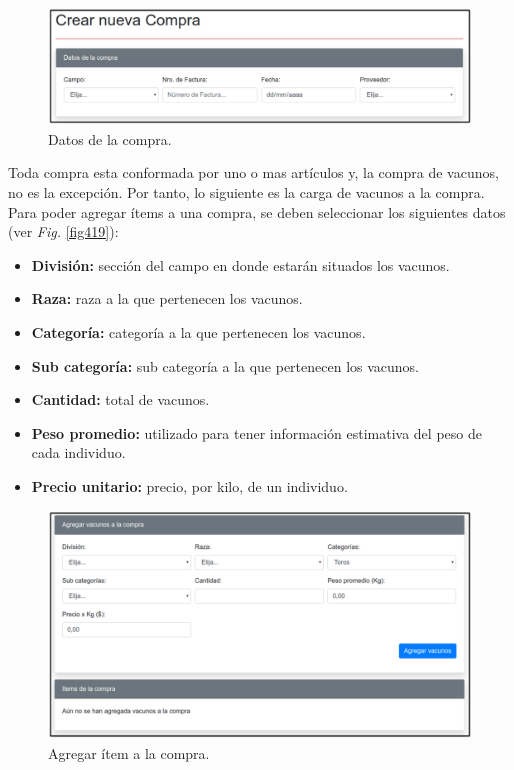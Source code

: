 \documentclass[11pt,oneside]{book}
\begin{document}
\begin{figure}[tbhp]
\centerline{\includegraphics[scale=0.87]{figs/capitulo_3_desarrollo/fig418.pdf}}
\caption{Datos de la compra.}
\label{fig418}
\end{figure}

Toda compra esta conformada por uno o mas artículos y, la compra de vacunos, no es la excepción. Por tanto, lo siguiente es la carga de vacunos a la compra. Para poder agregar ítems a una compra, se deben seleccionar los siguientes datos (ver \textit{Fig.} \eqref{fig419}):
\begin{itemize}
\item \textbf{División:} sección del campo en donde estarán situados los vacunos.
\item \textbf{Raza:} raza a la que pertenecen los vacunos.
\item \textbf{Categoría:} categoría a la que pertenecen los vacunos. 
\item \textbf{Sub categoría:} sub categoría a la que pertenecen los vacunos.
\item \textbf{Cantidad:} total de vacunos.
\item \textbf{Peso promedio:} utilizado para tener información estimativa del peso de cada individuo.
\item \textbf{Precio unitario:} precio, por kilo, de un individuo.
\end{itemize}

\begin{figure}[tbhp]
\centerline{\includegraphics[scale=0.87]{figs/capitulo_3_desarrollo/fig419.pdf}}
\caption{Agregar ítem a la compra.}
\label{fig419}
\end{figure}
\end{document}
